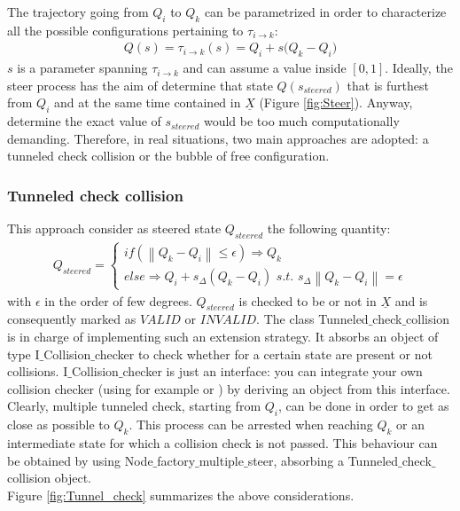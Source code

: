 The trajectory going from $Q_i$ to $Q_k$ can be parametrized in order to characterize all the possible configurations pertaining to $\tau_{i \rightarrow k}$:
\begin{eqnarray}
 Q(s) = \tau_{i \rightarrow k}(s) = Q_i + s \bigg ( Q_k - Q_i \bigg )
\end{eqnarray}
$s$ is a parameter spanning $\tau_{i \rightarrow k}$ and can assume a value inside $[0,1]$.
Ideally, the steer process has the aim of determine that state $Q(s_{steered})$ that is furthest from $Q_i$ and at the same time contained in $\underline{X}$ (Figure \ref{fig:Steer}). Anyway, determine the exact value of $s_{steered}$ would be too much computationally demanding. Therefore, in real situations, two main approaches are adopted: a tunneled check collision or the bubble of free configuration.

\subsubsection{Tunneled check collision}

This approach consider as steered state $Q_{steered}$ the following quantity:
\begin{eqnarray}
Q_{steered} = \left\{\begin{matrix}
\textit{if} (\left \| Q_k - Q_i \right \| \leq \epsilon) \Rightarrow Q_k 
\\ 
\textit{else} \Rightarrow Q_i + s_{\Delta} ( Q_k - Q_i ) \textit{   s.t.   } s_{\Delta} \left \| Q_k - Q_i  \right \| = \epsilon
\end{matrix}\right.
\end{eqnarray}
with $\epsilon$ in the order of few degrees. $Q_{steered}$ is checked to be or not in $\underline{X}$ and is consequently marked as $VALID$ or $INVALID$. The class Tunneled$\_$check$\_$collision is in charge of implementing such an extension strategy. It absorbs an object of type I$\_$Collision$\_$checker to check whether for a certain state are present or not collisions. I$\_$Collision$\_$checker is just an interface: you can integrate your own collision checker (using for example \cite{Bullet} or \cite{React}) by deriving an object from this interface.
\\
Clearly, multiple tunneled check, starting from $Q_i$, can be done in order to get as close as possible to $Q_k$. This process can be arrested when reaching $Q_k$ or an intermediate state for which a collision check is not passed. This behaviour can be obtained by using Node$\_$factory$\_$multiple$\_$steer, absorbing a Tunneled$\_$check$\_$collision object.
\\
Figure \ref{fig:Tunnel_check} summarizes the above considerations.

